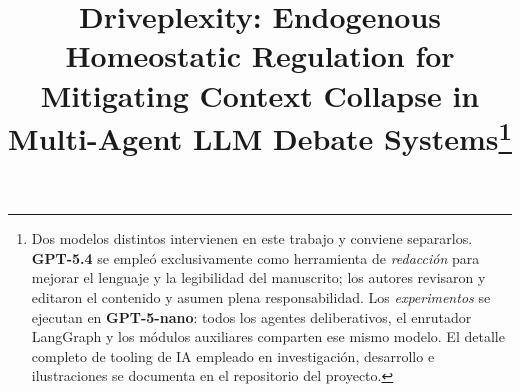 \documentclass{llncs}
\begin{document}
\title{Driveplexity: Endogenous Homeostatic Regulation for Mitigating Context
Collapse in Multi-Agent LLM Debate Systems\thanks{Dos modelos distintos
intervienen en este trabajo y conviene separarlos. \textbf{GPT-5.4} se
emple\'o exclusivamente como herramienta de \emph{redacci\'on} para
mejorar el lenguaje y la legibilidad del manuscrito; los autores
revisaron y editaron el contenido y asumen plena responsabilidad. Los
\emph{experimentos} se ejecutan en \textbf{GPT-5-nano}: todos los
agentes deliberativos, el enrutador LangGraph y los m\'odulos
auxiliares comparten ese mismo modelo. El detalle completo de tooling de
IA empleado en investigaci\'on, desarrollo e ilustraciones se documenta
en el repositorio del proyecto.}}

\author{}
\institute{}

\maketitle
\end{document}
